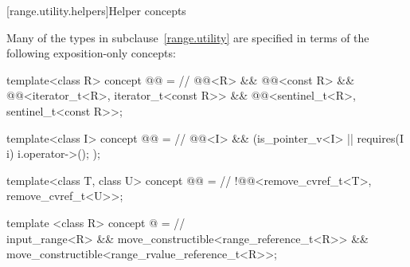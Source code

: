 \documentclass{wg21}
\begin{document}
[range.utility.helpers]{Helper concepts}

\pnum
Many of the types in subclause~\ref{range.utility} are specified in terms of
the following exposition-only concepts:

\begin{codeblock}
    template<class R>
    concept @@ =                                     // \expos
    @@<R> && @@<const R> &&
    @@<iterator_t<R>, iterator_t<const R>> &&
    @@<sentinel_t<R>, sentinel_t<const R>>;

    template<class I>
    concept @@ =                                       // \expos
    @@<I> && (is_pointer_v<I> || requires(I i) { i.operator->(); });

    template<class T, class U>
    concept @@ =                                  // \expos
    !@@<remove_cvref_t<T>, remove_cvref_t<U>>;
\end{codeblock}
\begin{addedblock}
\begin{codeblock}
    template <class R>
    concept @ = // \expos \\
             input_range<R> \&\& move_constructible<range_reference_t<R>> \&\& move_constructible<range_rvalue_reference_t<R>>;
\end{codeblock}
\end{addedblock}
\end{document}
